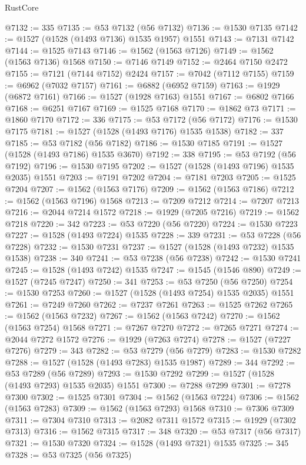 \begin{lexlean}{RustCore}
\begin{coremodule}
@7132 := 335
@7135 := @53 @7132 (@56 @7132)
@7136 := @1530 @7135
@7142 := @1527 (@1528 (@1493 @7136) @1535 @1957) @1551
@7143 := @7131 @7142
@7144 := @1525 @7143
@7146 := @1562 (@1563 @7126)
@7149 := @1562 (@1563 @7136) @1568
@7150 := @7146 @7149
@7152 := @2464 @7150 @2472
@7155 := @7121 (@7144 @7152) @2424
@7157 := @7042 (@7112 @7155)
@7159 := @6962 (@7032 @7157)
@7161 := @6882 (@6952 @7159)
@7163 := @1929 (@6872 @7161)
@7166 := @1527 (@1928 @7163) @1551
@7167 := @6802 @7166
@7168 := @6251 @7167
@7169 := @1525 @7168
@7170 := @1862 @73
@7171 := @1860 @7170
@7172 := 336
@7175 := @53 @7172 (@56 @7172)
@7176 := @1530 @7175
@7181 := @1527 (@1528 (@1493 @7176) @1535 @1538)
@7182 := 337
@7185 := @53 @7182 (@56 @7182)
@7186 := @1530 @7185
@7191 := @1527 (@1528 (@1493 @7186) @1535 @3670)
@7192 := 338
@7195 := @53 @7192 (@56 @7192)
@7196 := @1530 @7195
@7202 := @1527 (@1528 (@1493 @7196) @1535 @2035) @1551
@7203 := @7191 @7202
@7204 := @7181 @7203
@7205 := @1525 @7204
@7207 := @1562 (@1563 @7176)
@7209 := @1562 (@1563 @7186)
@7212 := @1562 (@1563 @7196) @1568
@7213 := @7209 @7212
@7214 := @7207 @7213
@7216 := @2044 @7214 @1572
@7218 := @1929 (@7205 @7216)
@7219 := @1562 @7218
@7220 := 342
@7223 := @53 @7220 (@56 @7220)
@7224 := @1530 @7223
@7227 := @1528 (@1493 @7224) @1535
@7228 := 339
@7231 := @53 @7228 (@56 @7228)
@7232 := @1530 @7231
@7237 := @1527 (@1528 (@1493 @7232) @1535 @1538)
@7238 := 340
@7241 := @53 @7238 (@56 @7238)
@7242 := @1530 @7241
@7245 := @1528 (@1493 @7242) @1535
@7247 := @1545 (@1546 @890)
@7249 := @1527 (@7245 @7247)
@7250 := 341
@7253 := @53 @7250 (@56 @7250)
@7254 := @1530 @7253
@7260 := @1527 (@1528 (@1493 @7254) @1535 @2035) @1551
@7261 := @7249 @7260
@7262 := @7237 @7261
@7263 := @1525 @7262
@7265 := @1562 (@1563 @7232)
@7267 := @1562 (@1563 @7242)
@7270 := @1562 (@1563 @7254) @1568
@7271 := @7267 @7270
@7272 := @7265 @7271
@7274 := @2044 @7272 @1572
@7276 := @1929 (@7263 @7274)
@7278 := @1527 (@7227 @7276)
@7279 := 343
@7282 := @53 @7279 (@56 @7279)
@7283 := @1530 @7282
@7288 := @1527 (@1528 (@1493 @7283) @1535 @1987)
@7289 := 344
@7292 := @53 @7289 (@56 @7289)
@7293 := @1530 @7292
@7299 := @1527 (@1528 (@1493 @7293) @1535 @2035) @1551
@7300 := @7288 @7299
@7301 := @7278 @7300
@7302 := @1525 @7301
@7304 := @1562 (@1563 @7224)
@7306 := @1562 (@1563 @7283)
@7309 := @1562 (@1563 @7293) @1568
@7310 := @7306 @7309
@7311 := @7304 @7310
@7313 := @2082 @7311 @1572
@7315 := @1929 (@7302 @7313)
@7316 := @1562 @7315
@7317 := 348
@7320 := @53 @7317 (@56 @7317)
@7321 := @1530 @7320
@7324 := @1528 (@1493 @7321) @1535
@7325 := 345
@7328 := @53 @7325 (@56 @7325)

\end{coremodule}
\end{lexlean}
